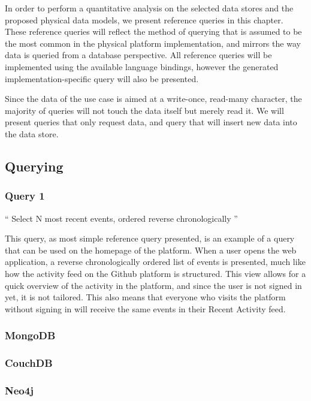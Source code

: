 
In order to perform a quantitative analysis on the selected data stores and the proposed physical data models, we present  reference queries in this chapter.
These reference queries will reflect the method of querying that is assumed to be the most common in the physical platform implementation, and mirrors the way data is queried from a database perspective.
All reference queries will be implemented using the available language bindings, however the generated implementation-specific query will also be presented.

Since the data of the use case is aimed at a write-once, read-many character, the majority of queries will not touch the data itself but merely read it.
We will present  queries that only request data, and  query that will insert new data into the data store.

\subsection{Querying}
\label{subsec:querying}

\subsubsection{Query 1}
\label{subsubsec:query-1}

``
Select N most recent events, ordered reverse chronologically
''

This query, as most simple reference query presented, is an example of a query that can be used on the homepage of the platform.
When a user opens the web application, a reverse chronologically ordered list of events is presented, much like how the activity feed on the Github platform is structured.
This view allows for a quick overview of the activity in the platform, and since the user is not signed in yet, it is not tailored.
This also means that everyone who visits the platform without signing in will receive the same events in their Recent Activity feed.

\subsubsection*{MongoDB}
\subsubsection*{CouchDB}
\subsubsection*{Neo4j}

